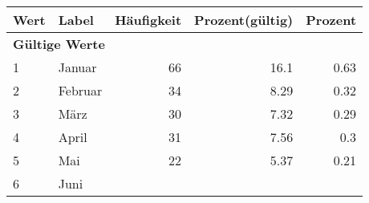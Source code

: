      \begin{longtable}{lXrrr}
     \toprule
     \textbf{Wert} & \textbf{Label} & \textbf{Häufigkeit} & \textbf{Prozent(gültig)} & \textbf{Prozent} \\
     \endhead
     \midrule
     \multicolumn{5}{l}{\textbf{Gültige Werte}}\\

     1 &
     \multicolumn{1}{X}{ Januar   } &


       \num{66} &
       \num[round-mode=places,round-precision=2]{16,1} &
         \num[round-mode=places,round-precision=2]{0,63} \\

     2 &
     \multicolumn{1}{X}{ Februar   } &


       \num{34} &
       \num[round-mode=places,round-precision=2]{8,29} &
         \num[round-mode=places,round-precision=2]{0,32} \\

     3 &
     \multicolumn{1}{X}{ März   } &


       \num{30} &
       \num[round-mode=places,round-precision=2]{7,32} &
         \num[round-mode=places,round-precision=2]{0,29} \\

     4 &
     \multicolumn{1}{X}{ April   } &


       \num{31} &
       \num[round-mode=places,round-precision=2]{7,56} &
         \num[round-mode=places,round-precision=2]{0,3} \\

     5 &
     \multicolumn{1}{X}{ Mai   } &


       \num{22} &
       \num[round-mode=places,round-precision=2]{5,37} &
         \num[round-mode=places,round-precision=2]{0,21} \\

     6 &
     \multicolumn{1}{X}{ Juni   } &



\end{longtable}
